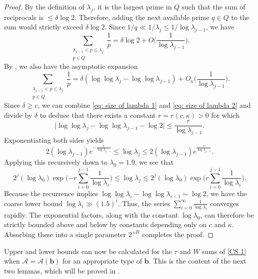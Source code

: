 \documentclass{amsart}
\theoremstyle{definition}
\numberwithin{equation}{section}
\newcommand{\density}{\delta}
\begin{document}
	\begin{proof}
		By the definition of $\lambda_j$, it is the largest prime in $Q$ such that the sum of reciprocals is $\leq \density \log 2$. Therefore, adding the next available prime $q \in Q$ to the sum would strictly exceed $\density \log 2$. Since $1/q \ll 1/\lambda_j \leq 1/\log \lambda_{j-1}$, we have
		\begin{equation}\label{eq: size of lambda 1}
			\sum_{\substack{\lambda_{j-1}< p \leq \lambda_j \\ p \in Q}} \frac{1}{p} = \density \log 2 + O\Big(\frac{1}{\log \lambda_{j-1}}\Big).
		\end{equation}
		By , we also have the asymptotic expansion
		\begin{equation}\label{eq: size of lambda 2}
			\sum_{\substack{\lambda_{j-1}< p \leq \lambda_j \\ p \in Q}} \frac{1}{p} = \delta(\log \log \lambda_j - \log \log \lambda_{j-1}) +O_{\kappa}\Big(\frac{1}{\log \lambda_{j-1}}\Big).
		\end{equation}
		Since $\density \geq c$, we can combine \eqref{eq: size of lambda 1} and \eqref{eq: size of lambda 2} and divide by $\delta$ to deduce that there exists a constant $r=r(c,\kappa)>0$ for which 
		\begin{equation*}
			\big|\log \log \lambda_j - \log \log \lambda_{j-1} - \log 2\big| \leq \frac{r}{\log \lambda_{j-1}}.
		\end{equation*}
		Exponentiating both sides yields
		$$ 2 (\log \lambda_{j-1}) e^{-\frac{r}{\log{\lambda_{j-1}}}} \leq \log \lambda_j \leq 2 (\log \lambda_{j-1}) e^{\frac{r}{\log{\lambda_{j-1}}}}.$$
		Applying this recursively down to $\lambda_0 = 1.9$, we see that 
		$$ 2^j (\log \lambda_0) \exp\bigg({-r\sum_{i = 0}^{j-1} \frac{1}{\log{\lambda_{i}}}}\bigg) \leq \log \lambda_j \leq 2^j (\log \lambda_0) \exp\bigg({r\sum_{i = 0}^{j-1} \frac{1}{\log{\lambda_{i}}}}\bigg).$$
		Because the recurrence implies $\log \log \lambda_i - \log \log \lambda_{i-1} \sim \log 2$, we have the coarse lower bound $\log \lambda_i \gg (1.5)^i$. Thus, the series $\sum_{i=0}^\infty \frac{1}{\log \lambda_i}$ converges rapidly. The exponential factors, along with the constant $\log \lambda_0$, can therefore be strictly bounded above and below by constants depending only on $c$ and $\kappa$. Absorbing these into a single parameter $2^{\pm R}$ completes the proof.
	\end{proof}
	
	 Upper and lower bounds can now be calculated for the $\tau$ and $W$ sums of \eqref{CS 1} when $\mathscr{A} = \mathscr{A}(\bm{b})$ for an appropriate type of $\bm{b}$. This is the content of the next two lemmas, which will be proved in . 
	
\end{document}
